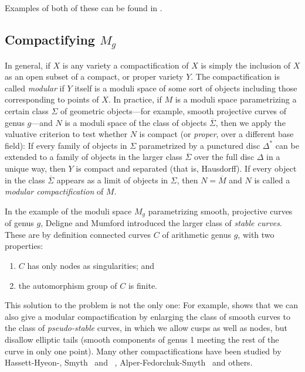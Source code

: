 Examples of both of these can be found in \cite[****]{GeomSchemes}.

\subsection{Compactifying $M_g$}\label{compactifying Mg}

In general, if $X$ is any variety a compactification of $X$ is simply the inclusion of $X$ as an open subset of a compact, or proper variety $Y$. The compactification is called \emph{modular} if $Y$ itself is a moduli space of some sort of objects including those corresponding to points of $X$. In practice, if $M$ is a moduli space parametrizing a certain class $\Sigma$ of geometric objects---for example, smooth projective curves of genus $g$---and $N$ is a moduli space of the class of objects $\overline \Sigma$, then we apply the valuative criterion to test whether $N$ is compact (or \emph{proper}, over a different base field): If every family of objects in $\Sigma$ parametrized by a punctured disc $\Delta^*$ can be extended to a family of objects in the larger class $\overline \Sigma$ over the full disc $\Delta$ in a unique way, then $Y$ is compact and separated (that is, Hausdorff). If every object in the class $\overline \Sigma$ appears as a limit of objects in $\Sigma$, then $N = \overline M$ and $N$ is called a \emph{modular compactification} of $M$.

In the example of the moduli space $M_g$ parametrizing smooth, projective curves of genus $g$, Deligne and Mumford introduced the larger class of \emph{stable curves}. These are by definition connected curves $C$ of arithmetic genus $g$, with two properties:

\begin{enumerate}
\item $C$ has only nodes as singularities; and
\item the automorphism group of $C$ is finite.
\end{enumerate}

This  solution to the problem is not the only one: For example, \cite{MR1106299} shows that we can also give a modular compactification by enlarging the class of smooth curves to the class of \emph{pseudo-stable} curves, in which we allow cusps as well as nodes, but disallow elliptic tails (smooth components of genus 1 meeting the rest of the curve in only one point). Many other compactifications have been studied by Hassett-Hyeon-\cite{MR2500894}, Smyth~\cite{MR2801404} and ~\cite{MR3044128}, Alper-Fedorchuk-Smyth~\cite{MR3020172} and others.

